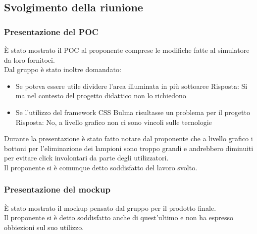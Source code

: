 \documentclass[12pt]{article}
\begin{document}
\subsection{Svolgimento della riunione}
\subsubsection{Presentazione del POC}
È stato mostrato il POC al proponente comprese le modifiche fatte al simulatore da loro fornitoci.
\\
Dal gruppo è stato inoltre domandato: 
\begin{itemize}
    \item Se poteva essere utile dividere l'area illuminata in più sottoaree
    \subitem Risposta: Si ma nel contesto del progetto didattico non lo richiedono 
    \item Se l'utilizzo del framework CSS Bulma risultasse un problema per il progetto
    \subitem Risposta: No, a livello grafico non ci sono vincoli sulle tecnologie
\end{itemize}

Durante la presentazione è stato fatto notare dal proponente che a livello grafico i bottoni per l'eliminazione dei lampioni sono troppo grandi e andrebbero diminuiti per evitare click involontari da parte degli utilizzatori.
\\Il proponente si è comunque detto soddisfatto del lavoro svolto. 

\subsubsection{Presentazione del mockup}
È stato mostrato il mockup pensato dal gruppo per il prodotto finale.\\

Il proponente si è detto soddisfatto anche di quest'ultimo e non ha espresso obbiezioni sul suo utilizzo.
\end{document}
